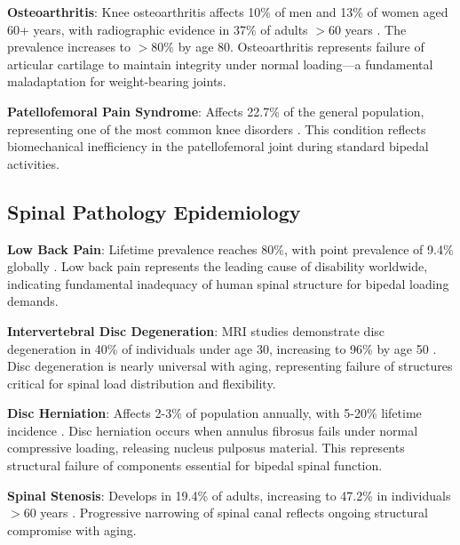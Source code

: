 \documentclass[12pt,a4paper]{article}
\begin{document}
\textbf{Osteoarthritis}: Knee osteoarthritis affects 10\% of men and 13\% of women aged 60+ years, with radiographic evidence in 37\% of adults $>$60 years \citep{zhang2010prevalence}. The prevalence increases to $>80\%$ by age 80. Osteoarthritis represents failure of articular cartilage to maintain integrity under normal loading—a fundamental maladaptation for weight-bearing joints.

\textbf{Patellofemoral Pain Syndrome}: Affects 22.7\% of the general population, representing one of the most common knee disorders \citep{smith2018incidence}. This condition reflects biomechanical inefficiency in the patellofemoral joint during standard bipedal activities.

\subsection{Spinal Pathology Epidemiology}

\textbf{Low Back Pain}: Lifetime prevalence reaches 80\%, with point prevalence of 9.4\% globally \citep{hoy2012global}. Low back pain represents the leading cause of disability worldwide, indicating fundamental inadequacy of human spinal structure for bipedal loading demands.

\textbf{Intervertebral Disc Degeneration}: MRI studies demonstrate disc degeneration in 40\% of individuals under age 30, increasing to 96\% by age 50 \citep{brinjikji2015systematic}. Disc degeneration is nearly universal with aging, representing failure of structures critical for spinal load distribution and flexibility.

\textbf{Disc Herniation}: Affects 2-3\% of population annually, with 5-20\% lifetime incidence \citep{jordan2009herniated}. Disc herniation occurs when annulus fibrosus fails under normal compressive loading, releasing nucleus pulposus material. This represents structural failure of components essential for bipedal spinal function.

\textbf{Spinal Stenosis}: Develops in 19.4\% of adults, increasing to 47.2\% in individuals $>$60 years \citep{kalichman2009spinal}. Progressive narrowing of spinal canal reflects ongoing structural compromise with aging.
\end{document}
